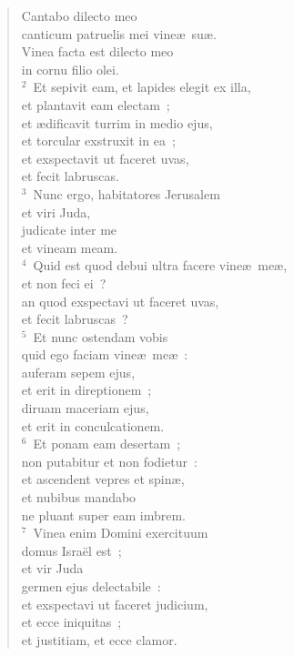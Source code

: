 \begin{flushleft}\begin{verse}\vspace{-19pt}Cantabo dilecto meo\\ canticum patruelis mei vine\ae\ su\ae .\\ Vinea facta est dilecto meo\\ in cornu filio olei.\\
${}^{2}$~Et sepivit eam, et lapides elegit ex illa,\\ et plantavit eam electam~;\\ et \ae dificavit turrim in medio ejus,\\ et torcular exstruxit in ea~;\\ et exspectavit ut faceret uvas,\\ et fecit labruscas.\\
${}^{3}$~Nunc ergo, habitatores Jerusalem\\ et viri Juda,\\ judicate inter me\\ et vineam meam.\\
${}^{4}$~Quid est quod debui ultra facere vine\ae\ me\ae ,\\ et non feci ei~?\\ an quod exspectavi ut faceret uvas,\\ et fecit labruscas~?\\
${}^{5}$~Et nunc ostendam vobis\\ quid ego faciam vine\ae\ me\ae~:\\ auferam sepem ejus,\\ et erit in direptionem~;\\ diruam maceriam ejus,\\ et erit in conculcationem.\\
${}^{6}$~Et ponam eam desertam~;\\ non putabitur et non fodietur~:\\ et ascendent vepres et spin\ae ,\\ et nubibus mandabo\\ ne pluant super eam imbrem.\\
${}^{7}$~Vinea enim Domini exercituum\\ domus Isra\"el est~;\\ et vir Juda\\ germen ejus delectabile~:\\ et exspectavi ut faceret judicium,\\ et ecce iniquitas~;\\ et justitiam, et ecce clamor.\end{verse}\end{flushleft}


